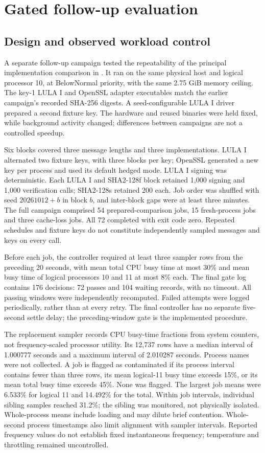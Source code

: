 \section{Gated follow-up evaluation}\label{sec:stability}
\subsection{Design and observed workload control}
A separate follow-up campaign tested the repeatability of the principal implementation comparison in . It ran on the same physical host and logical processor 10, at BelowNormal priority, with the same 2.75 GiB memory ceiling. The key-1 LULA I and OpenSSL adapter executables match the earlier campaign's recorded SHA-256 digests. A seed-configurable LULA I driver prepared a second fixture key. The hardware and reused binaries were held fixed, while background activity changed; differences between campaigns are not a controlled speedup.

Six blocks covered three message lengths and three implementations. LULA I alternated two fixture keys, with three blocks per key; OpenSSL generated a new key per process and used its default hedged mode. LULA I signing was deterministic. Each LULA I and SHA2-128f block retained 1,000 signing and 1,000 verification calls; SHA2-128s retained 200 each. Job order was shuffled with seed $20261012+b$ in block $b$, and inter-block gaps were at least three minutes. The full campaign comprised 54 prepared-comparison jobs, 15 fresh-process jobs and three cache-loss jobs. All 72 completed with exit code zero. Repeated schedules and fixture keys do not constitute independently sampled messages and keys on every call.

Before each job, the controller required at least three sampler rows from the preceding 20 seconds, with mean total CPU busy time at most 30\% and mean busy time of logical processors 10 and 11 at most 8\% each. The final gate log contains 176 decisions: 72 passes and 104 waiting records, with no timeout. All passing windows were independently recomputed. Failed attempts were logged periodically, rather than at every retry. The final controller has no separate five-second settle delay; the preceding-window gate is the implemented procedure.

The replacement sampler records CPU busy-time fractions from system counters, not frequency-scaled processor utility. Its 12,737 rows have a median interval of 1.000777 seconds and a maximum interval of 2.010287 seconds. Process names were not collected. A job is flagged as contaminated if its process interval contains fewer than three rows, its mean logical-11 busy time exceeds 15\%, or its mean total busy time exceeds 45\%. None was flagged. The largest job means were 6.533\% for logical 11 and 14.492\% for the total. Within job intervals, individual sibling samples reached 31.2\%; the sibling was monitored, not physically isolated. Whole-process means include loading and may dilute brief contention. Whole-second process timestamps also limit alignment with sampler intervals. Reported frequency values do not establish fixed instantaneous frequency; temperature and throttling remained uncontrolled.

